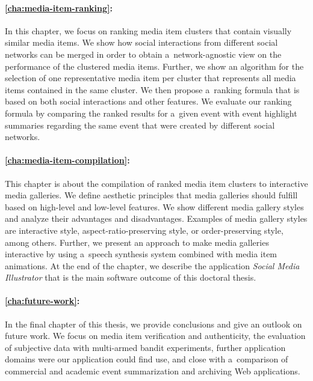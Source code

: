 \paragraph{\autoref{cha:media-item-ranking}:}

In this chapter, we focus on ranking media item clusters
that contain visually similar media items.
We show how social interactions from different social networks
can be merged in order to obtain a~network-agnostic view
on the performance of the clustered media items.
Further, we show an algorithm for the selection of
one representative media item per cluster that represents
all media items contained in the same cluster.
We then propose a~ranking formula that is based on both
social interactions and other features.
We evaluate our ranking formula by comparing the ranked results
for a~given event with event highlight summaries regarding the same event
that were created by different social networks.

\paragraph{\autoref{cha:media-item-compilation}:}

This chapter is about the compilation of ranked media item clusters
to interactive media galleries.
We define aesthetic principles that media galleries should fulfill
based on high-level and low-level features.
We show different media gallery styles and analyze their
advantages and disadvantages.
Examples of media gallery styles are interactive style, aspect-ratio-preserving style, or order-preserving style, among others.
Further, we present an approach to make media galleries interactive
by using a~speech synthesis system combined with media item animations.
At the end of the chapter, we describe the application
\emph{Social Media Illustrator} that is
the main software outcome of this doctoral thesis.

\paragraph{\autoref{cha:future-work}:}

In the final chapter of this thesis,
we provide conclusions and give an outlook on future work.
We focus on media item verification and authenticity,
the evaluation of subjective data with multi-armed bandit experiments,
further application domains were our application could find use,
and close with a~comparison of commercial and academic event summarization
and archiving Web applications.

\clearpage
\printbibliography[heading=subbibliography]